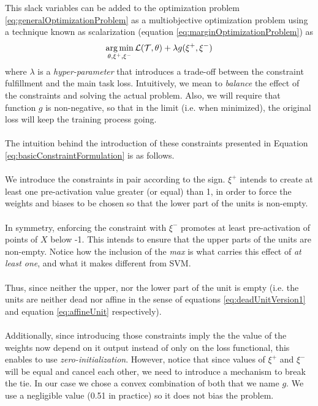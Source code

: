 This slack variables can be added to the optimization problem \ref{eq:generalOptimizationProblem} as a multiobjective optimization problem using a technique known as scalarization \cite{boyd} (equation \ref{eq:marginOptimizationProblem}) as
\begin{equation}\label{eq:marginOptimizationProblem}
\operatorname*{arg\,min}_{\theta,\xi^{+},\xi^{-}} \mathcal{L}(\mathcal{T},\theta) + \lambda g(\xi^{+},\xi^{-})
\end{equation}
where $\lambda$ is a \emph{hyper-parameter} that introduces a trade-off between the constraint fulfillment and the main task loss. Intuitively, we mean to \emph{balance} the effect of the constraints and solving the actual problem.
Also, we will require that function $g$ is non-negative, so that in the limit (i.e. when minimized), the original loss will keep the training process going. 
\\\\
The intuition behind the introduction of these constraints presented in Equation \ref{eq:basicConstraintFormulation} is as follows. 
\\\\
We introduce the constraints in pair according to the sign. $\xi^{+}$ intends to create at least one pre-activation value greater (or equal) than 1, in order to force the weights and biases to be chosen so that the lower part of the units is non-empty. 
\\\\
In symmetry, enforcing the constraint with $\xi^{-}$ promotes at least pre-activation of points of $X$ below -1. This intends to ensure that the upper parts of the units are non-empty. Notice how the inclusion of the \emph{max} is what carries this effect of \emph{at least one}, and what it makes different from SVM.
\\\\
Thus, since neither the upper, nor the lower part of the unit is empty (i.e. the units are neither dead nor affine in the sense of equations \ref{eq:deadUnitVersion1} and equation \ref{eq:affineUnit} respectively).
\\\\
Additionally, since introducing those constraints imply the the value of the weights now depend on it output instead of only on the loss functional, this enables to use \emph{zero-initialization}. However, notice that since values of $\xi^+$ and $\xi^-$ will be equal and cancel each other, we need to introduce a mechanism to break the tie. In our case we chose a convex combination of both that we name $g$. We use a negligible value (0.51 in practice) so it does not bias the problem.

